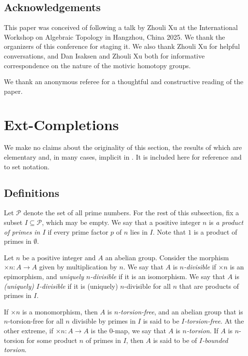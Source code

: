 \documentclass[11pt, oneside, dvipsnames, svgnames, table, final]{amsart}
\theoremstyle{plain}
\theoremstyle{definition}
\theoremstyle{remark}
\newcommand{\sh}[1]{\mathcal{#1}}
\newcommand{\<}[1]{{\langle}#1 {\rangle}}
\begin{document}
\subsection{Acknowledgements}
\label{sec:acknowledgments}

This paper was conceived of following a talk by Zhouli Xu at the International Workshop on Algebraic Topology in Hangzhou, China 2025. We thank the organizers of this conference for staging it. We also thank Zhouli Xu for helpful conversations, and Dan Isaksen and Zhouli Xu both for informative correspondence on the nature of the motivic homotopy groups.

We thank an anonymous referee for a thoughtful and constructive reading of the paper.

\section{Ext-Completions}%
\label{sec:completions}

We make no claims about the originality of this section, the results of which are elementary and, in many cases, implicit in \cite{Rotman1968}. It is included here for reference and to set notation. 

\subsection{Definitions}
\label{sec:definitions}


Let $\sh P$ denote the set of all prime numbers. For the rest of this subsection, fix a subset $I \subseteq \sh P$, which may be empty. We say that a positive integer $n$ is \emph{a product of primes in $I$} if every prime factor $p$ of $n$ lies in $I$. Note that $1$ is a product of primes in $\emptyset$.

Let $n$ be a positive integer and $A$ an abelian group. Consider the morphism $\times n : A \to A$ given by multiplication by $n$. We say that $A$ is \emph{$n$-divisible} if $\times n$ is an epimorphism, and \emph{uniquely $n$-divisible} if it is an isomorphism. We say that $A$ is \emph{(uniquely) $I$-divisible} if it is (uniquely) $n$-divisible for all $n$ that are products of primes in $I$. %


If $\times n$ is a monomorphism, then $A$ is \emph{$n$-torsion-free}, and an abelian group that is $n$-torsion-free for all $n$ divisible by primes in $I$ is said to be \emph{$I$-torsion-free}. At the other extreme, if $\times n: A \to A$ is the $0$-map, we say that $A$ is \emph{$n$-torsion}. If $A$ is $n$-torsion for some product $n$ of primes in $I$, then $A$ is said to be of \emph{$I$-bounded torsion}.
\end{document}
